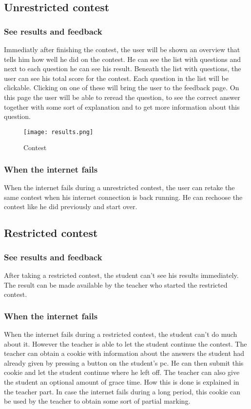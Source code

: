 \subsection{Unrestricted contest}

\subsubsection{See results and feedback}
Immediatly after finishing the contest, the user will be shown an overview that tells him how well he did on the contest. He can see the list with questions and next to each question he can see his result. Beneath the list with questions, the user can see his total score for the contest. Each question in the list will be clickable. Clicking on one of these will bring the user to the feedback page. On this page the user will be able to reread the question, to see the correct answer together with some sort of explanation and to get more information about this question.  

		\begin{figure}[h]
		  \centering
			\texttt{[image: results.png]}
		  \caption{Contest}
		  \label{Contest}
		\end{figure}

\subsubsection{When the internet fails}
When the internet fails during a unrestricted contest, the user can retake the same contest when his internet connection is back running. He can rechoose the contest like he did previously and start over. 

\subsection{Restricted contest}

\subsubsection{See results and feedback}
After taking a restricted contest, the student can't see his results immediately. The result can be made available by the teacher who started the restricted contest. 

\subsubsection{When the internet fails}
When the internet fails during a restricted contest, the student can't do much about it. However the teacher is able to let the student continue the contest. The teacher can obtain a cookie with information about the answers the student had already given by pressing a button on the student's pc. He can then submit this cookie and let the student continue where he left off. The teacher can also give the student an optional amount of grace time. How this is done is explained in the teacher part. In case the internet fails during a long period, this cookie can be used by the teacher to obtain some sort of partial marking. 

